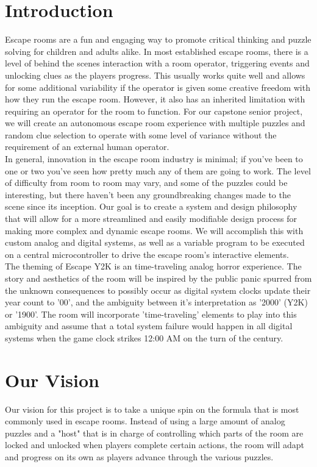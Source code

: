 \documentclass[conference]{IEEEtran}
\begin{document}
\section{Introduction}
Escape rooms are a fun and engaging way to promote critical thinking and puzzle solving for children and adults
alike. In most established escape rooms, there is a level of behind the scenes interaction with a room operator,
triggering events and unlocking clues as the players progress. This usually works quite well and allows for some
additional variability if the operator is given some creative freedom with how they run the escape room. However,
it also has an inherited limitation with requiring an operator for the room to function. For our capstone senior
project, we will create an autonomous escape room experience with multiple puzzles and random clue selection to
operate with some level of variance without the requirement of an external human operator.
\\
\indent In general, innovation in the escape room industry is minimal; if you've been to one or two you've seen how
pretty much any of them are going to work. The level of difficulty from room to room may vary, and some of the
puzzles could be interesting, but there haven't been any groundbreaking changes made to the scene since its inception.
Our goal is to create a system and design philosophy that will allow for a more streamlined and easily modifiable
design process for making more complex and dynamic escape rooms. We will accomplish this with custom analog and digital
systems, as well as a variable program to be executed on a central microcontroller to drive the escape room's
interactive elements.
\\
\indent The theming of Escape Y2K is an time-traveling analog horror experience. The story and aesthetics of the room
will be inspired by the public panic spurred from the unknown consequences to possibly occur as digital system
clocks update their year count to '00', and the ambiguity between it's interpretation as '2000' (Y2K) or '1900'.
The room will incorporate 'time-traveling' elements to play into this ambiguity and assume that a total system
failure would happen in all digital systems when the game clock strikes 12:00 AM on the turn of the century.
\\


\section{Our Vision}
Our vision for this project is to take a unique spin on the formula that is most commonly used in escape rooms.
Instead of using a large amount of analog puzzles and a "host" that is in charge of controlling which parts of
the room are locked and unlocked when players complete certain actions, the room will adapt and progress on its
own as players advance through the various puzzles.
\end{document}
